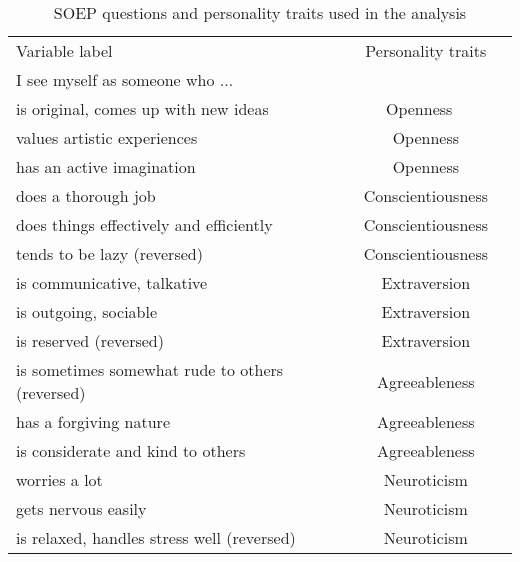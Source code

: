 \documentclass[11pt]{beamer}
\begin{document}
\begin{table}
	\caption{SOEP questions and personality traits used in the analysis }
	\begin{tabular}{l c |  c }
 		Variable label    & Personality traits \\
 		I see myself as someone who ...&\\
 		\hline
 		is original, comes up with new ideas  &Openness \ \\
 		values artistic experiences&Openness \\
 		has an active imagination&Openness\\
 		
 		does a thorough job&   Conscientiousness \\
 		does things effectively and efficiently &Conscientiousness \\
 		tends to be lazy (reversed) &Conscientiousness   \\
		
 		is communicative, talkative&   Extraversion \\
	 	is outgoing, sociable& Extraversion \\
 		is reserved (reversed)& Extraversion \\
 		
 		is sometimes somewhat rude to others (reversed)&Agreeableness\\
 		has a forgiving nature&Agreeableness \\
 		is considerate and kind to others&Agreeableness \\
 	
 		worries a lot&Neuroticism\\
 		gets nervous easily&Neuroticism \\
 		is relaxed, handles stress well (reversed)& Neuroticism\\
 		
	\end{tabular}
\end{table}
\end{document}
